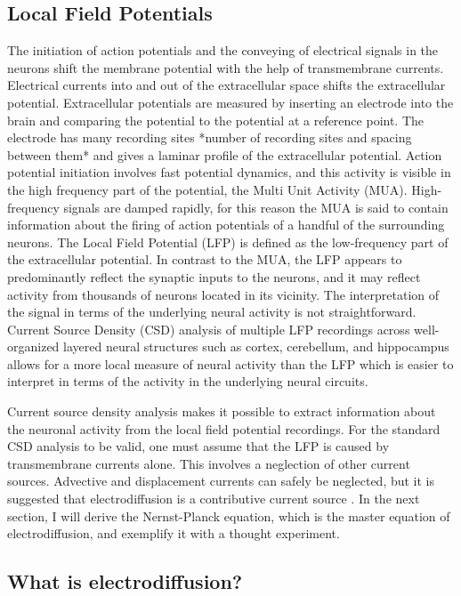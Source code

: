 \documentclass{article}
\begin{document}
\subsection{Local Field Potentials}\label{Local Field Potentials}
The initiation of action potentials and the conveying of electrical signals in the neurons shift the membrane potential with the help of transmembrane currents. Electrical currents into and out of the extracellular space shifts the extracellular potential. Extracellular potentials are measured by inserting an electrode into the brain and comparing the potential to the potential at a reference point. The electrode has many recording sites *number of recording sites and spacing between them* and gives a laminar profile of the extracellular potential. Action potential initiation involves fast potential dynamics, and this activity is visible in the high frequency part of the potential, the Multi Unit Activity (MUA). High-frequency signals are damped rapidly, for this reason the MUA is said to contain information about the firing of action potentials of a handful of the surrounding neurons. 
The Local Field Potential (LFP) is defined as the low-frequency part of the extracellular potential. In contrast to the MUA, the LFP appears to predominantly reflect the synaptic inputs to the neurons, and it may reflect activity from thousands of
neurons located in its vicinity. The interpretation of the signal in terms of the underlying neural activity is not straightforward. Current Source Density (CSD) analysis of multiple LFP recordings across well-organized
layered neural structures such as cortex, cerebellum, and hippocampus allows for a more local measure of neural activity than the LFP which is easier to interpret in terms of the activity in the underlying neural circuits.\cite{EinevollLFP}

Current source density analysis makes it possible to extract information about the neuronal activity from the local field potential recordings. For the standard CSD analysis to be valid, one must assume that the LFP is caused by transmembrane currents alone. This involves a neglection of other current sources. Advective and displacement currents can safely be neglected, but it is suggested that electrodiffusion is a contributive current source \cite{Gratiy2017}. In the next section, I will derive the Nernst-Planck equation, which is the master equation of electrodiffusion, and exemplify it with a thought experiment.

\subsection{What is electrodiffusion?}\label{electrodiffusion}
\end{document}
